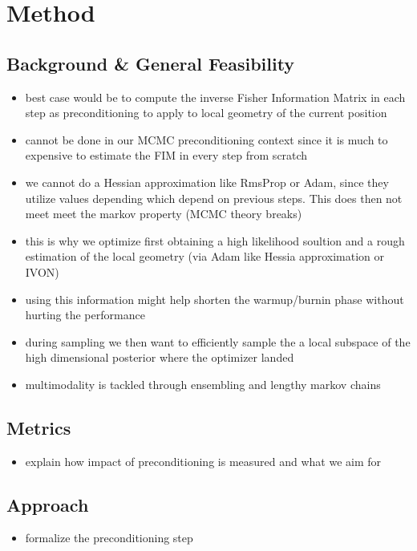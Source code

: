 \section{Method}\label{sec:method}
\subsection{Background \& General Feasibility}\label{sec:general_idea}

\begin{itemize}
    \item best case would be to compute the inverse Fisher Information Matrix in each step as preconditioning to apply to local geometry of the current position
    \item cannot be done in our MCMC preconditioning context since it is much to expensive to estimate the FIM in every step from scratch
    \item we cannot do a Hessian approximation like RmsProp or Adam, since they utilize values depending which depend on previous steps. This does then not meet meet the markov property (MCMC theory breaks)
    \item this is why we optimize first obtaining a high likelihood soultion and a rough estimation of the local geometry (via Adam like Hessia approximation or IVON)
    \item using this information might help shorten the warmup/burnin phase without hurting the performance
    \item during sampling we then want to efficiently sample the a local subspace of the high dimensional posterior where the optimizer landed
    \item multimodality is tackled through ensembling and lengthy markov chains
\end{itemize}

\subsection{Metrics}
\begin{itemize}
    \item explain how impact of preconditioning is measured and what we aim for
\end{itemize}

\subsection{Approach}
\begin{itemize}
    \item formalize the preconditioning step
\end{itemize}

\newpage
